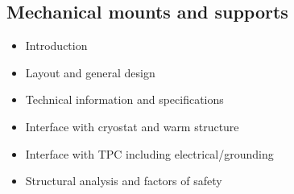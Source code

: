 \subsection{Mechanical mounts and supports}
\begin{itemize}
\item Introduction 
\item Layout and general design
\item Technical information and specifications
\item Interface with cryostat and warm structure
\item Interface with TPC including electrical/grounding 
\item Structural analysis and factors of safety
\end{itemize}

